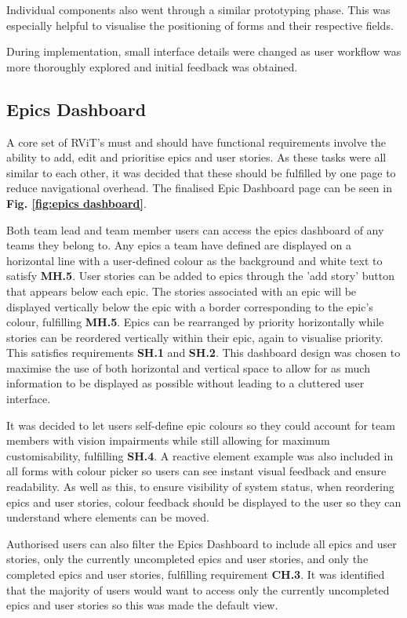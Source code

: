 \documentclass[l4proj.tex]{subfiles}
\begin{document}
Individual components also went through a similar prototyping phase. This was especially helpful to visualise the positioning of forms and their respective fields. 

During implementation, small interface details were changed as user workflow was more thoroughly explored and initial feedback was obtained.



\subsection{Epics Dashboard}
A core set of RViT's must and should have functional requirements involve the ability to add, edit and prioritise epics and user stories. As these tasks were all similar to each other, it was decided that these should be fulfilled by one page to reduce navigational overhead. The finalised Epic Dashboard page can be seen in \textbf{Fig. \ref{fig:epics dashboard}}.

Both team lead and team member users can access the epics dashboard of any teams they belong to. Any epics a team have defined are displayed on a horizontal line with a user-defined colour as the background and white text to satisfy \textbf{MH.5}.  User stories can be added to epics through the 'add story' button that appears below each epic. The stories associated with an epic will be displayed vertically below the epic with a border corresponding to the epic's colour, fulfilling \textbf{MH.5}. Epics can be rearranged by priority horizontally while stories can be reordered vertically within their epic, again to visualise priority. This satisfies requirements \textbf{SH.1} and \textbf{SH.2}. This dashboard design was chosen to maximise the use of both horizontal and vertical space to allow for as much information to be displayed as possible without leading to a cluttered user interface.

It was decided to let users self-define epic colours so they could account for team members with vision impairments while still allowing for maximum customisability, fulfilling \textbf{SH.4}. A reactive element example was also included in all forms with colour picker so users can see instant visual feedback and ensure readability. As well as this, to ensure visibility of system status, when reordering epics and user stories, colour feedback should be displayed to the user so they can understand where elements can be moved.

Authorised users can also filter the Epics Dashboard to include all epics and user stories, only the currently uncompleted epics and user stories, and only the completed epics and user stories, fulfilling requirement \textbf{CH.3}. It was identified that the majority of users would want to access only the currently uncompleted epics and user stories so this was made the default view.
\end{document}
